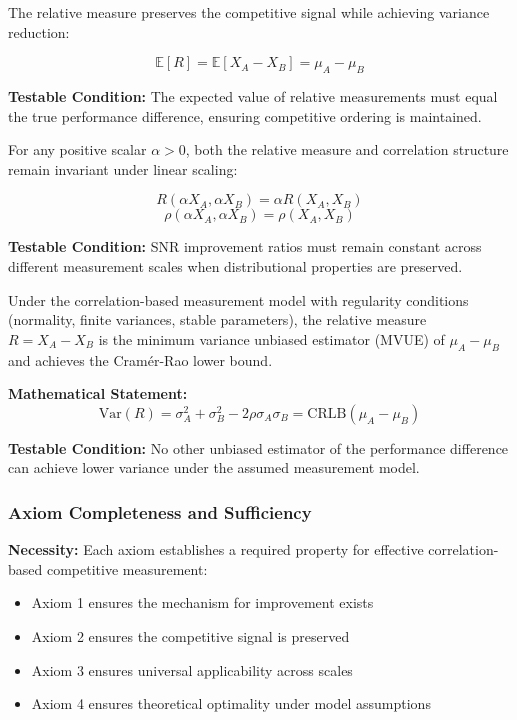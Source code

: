 \begin{axiom}
The relative measure preserves the competitive signal while achieving variance reduction:

$$\mathbb{E}[R] = \mathbb{E}[X_A - X_B] = \mu_A - \mu_B$$

\textbf{Testable Condition:} The expected value of relative measurements must equal the true performance difference, ensuring competitive ordering is maintained.
\end{axiom}

\begin{axiom}
For any positive scalar $\alpha > 0$, both the relative measure and correlation structure remain invariant under linear scaling:

$$R(\alpha X_A, \alpha X_B) = \alpha R(X_A, X_B)$$
$$\rho(\alpha X_A, \alpha X_B) = \rho(X_A, X_B)$$

\textbf{Testable Condition:} SNR improvement ratios must remain constant across different measurement scales when distributional properties are preserved.
\end{axiom}

\begin{axiom}
Under the correlation-based measurement model with regularity conditions (normality, finite variances, stable parameters), the relative measure $R = X_A - X_B$ is the minimum variance unbiased estimator (MVUE) of $\mu_A - \mu_B$ and achieves the Cramér-Rao lower bound.

\textbf{Mathematical Statement:}
$$\text{Var}(R) = \sigma_A^2 + \sigma_B^2 - 2\rho\sigma_A\sigma_B = \text{CRLB}(\mu_A - \mu_B)$$

\textbf{Testable Condition:} No other unbiased estimator of the performance difference can achieve lower variance under the assumed measurement model.
\end{axiom}

\subsubsection{Axiom Completeness and Sufficiency}

\textbf{Necessity:} Each axiom establishes a required property for effective correlation-based competitive measurement:
\begin{itemize}
    \item Axiom 1 ensures the mechanism for improvement exists
    \item Axiom 2 ensures the competitive signal is preserved  
    \item Axiom 3 ensures universal applicability across scales
    \item Axiom 4 ensures theoretical optimality under model assumptions
\end{itemize}

